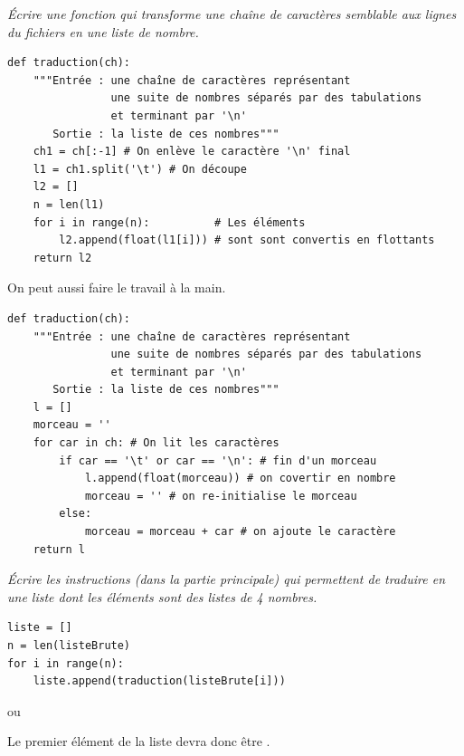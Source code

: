 \begin{Exercise}\it Écrire une fonction  qui transforme une chaîne de caractères semblable aux lignes du fichiers en une liste de nombre.
\end{Exercise}
\begin{Answer}
\begin{lstlisting}
def traduction(ch):
    """Entrée : une chaîne de caractères représentant
                une suite de nombres séparés par des tabulations
                et terminant par '\n'
       Sortie : la liste de ces nombres"""
    ch1 = ch[:-1] # On enlève le caractère '\n' final
    l1 = ch1.split('\t') # On découpe
    l2 = [] 
    n = len(l1)
    for i in range(n):          # Les éléments 
        l2.append(float(l1[i])) # sont sont convertis en flottants
    return l2
\end{lstlisting}
On peut aussi faire le travail à la main.
\begin{lstlisting}
def traduction(ch):
    """Entrée : une chaîne de caractères représentant
                une suite de nombres séparés par des tabulations
                et terminant par '\n'
       Sortie : la liste de ces nombres"""
    l = []
    morceau = ''
    for car in ch: # On lit les caractères
        if car == '\t' or car == '\n': # fin d'un morceau
            l.append(float(morceau)) # on covertir en nombre
            morceau = '' # on re-initialise le morceau
        else:
            morceau = morceau + car # on ajoute le caractère
    return l                
\end{lstlisting}
\end{Answer}
\begin{Exercise}\label{qu:liste}\it Écrire les instructions (dans la partie principale) qui permettent de traduire  en une liste  dont les éléments sont des listes de 4 nombres.
\end{Exercise}
\begin{Answer}
\begin{lstlisting}
liste = []
n = len(listeBrute)
for i in range(n):
    liste.append(traduction(listeBrute[i]))
\end{lstlisting}
ou 
\newpage
\end{Answer}
Le premier élément de la liste devra donc être \type{[1.0, 0.0000000, 7.3876953, 1.9042969]}.
